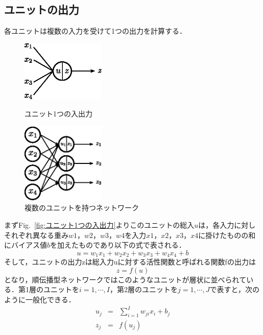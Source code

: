 \documentclass[a4paper,10pt]{jsarticle}
\begin{document}
\subsection{ユニットの出力}
各ユニットは複数の入力を受けて1つの出力を計算する．
\begin{figure}[b]
 \begin{minipage}{0.5\hsize}
  \begin{center}
   \includegraphics[width=40mm]{fig/eps/input_output.eps}
  \end{center}
  \caption{ユニット1つの入出力}
  \label{fig:ユニット1つの入出力}
 \end{minipage}
 \begin{minipage}{0.5\hsize}
  \begin{center}
   \includegraphics[width=40mm]{fig/eps/network.eps}
  \end{center}
  \caption{複数のユニットを持つネットワーク}
  \label{fig:複数のユニットを持つネットワーク}
 \end{minipage}
\end{figure}
まずFig.~\ref{fig:ユニット1つの入出力}よりこのユニットの総入$u$は，各入力に対しそれぞれ異なる重み$w1$，$w2$，$w3$，$w4$を入力$x1$，$x2$，$x3$，$x4$に掛けたものの和にバイアス値$b$を加えたものであり以下の式で表される．
\begin{equation}
  u = w_1x_1+w_2x_2+w_3x_3+w_4x_4+b
\end{equation}
そして，ユニットの出力zは総入力uに対する活性関数と呼ばれる関数fの出力は
\begin{equation}
  z = f(u)
\end{equation}
となり，順伝播型ネットワークではこのようなユニットが層状に並べられている．第1層のユニットを$i=1,\cdots,I$，第2層のユニットを$j=1,\cdots,J$で表すと，次のように一般化できる．
\begin{eqnarray}
  u_j & = & \sum_{i=1}^I w_{ji}x_i + b_j\\
  z_j & = & f(u_j)
\end{eqnarray}
\end{document}
